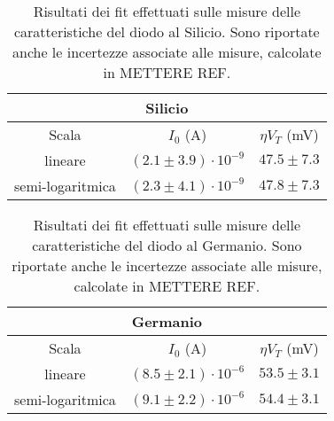 \documentclass[@SRC@/main]{subfiles}
\begin{document}
    \begin{table}[ht]
        \centering
        \begin{tabular}{||c|c|c||}
            \hline
            \multicolumn{3}{||c||}{Silicio} \\
            \hline
            Scala            & $I_0$ (\textnormal{A})       & $\eta V_T$ (\textnormal{mV}) \\
            \hline
            lineare          & $(2.1\pm3.9)\cdot 10^{-9}$   & $47.5\pm7.3$                 \\
            \hline
            semi-logaritmica & $(2.3 \pm 4.1)\cdot 10^{-9}$ & $47.8\pm 7.3$                \\
            \hline
        \end{tabular}
        \caption{Risultati dei fit effettuati sulle misure delle caratteristiche del diodo
        al Silicio. Sono riportate anche le incertezze associate alle misure, calcolate in METTERE REF.}
        \label{tab:fit-silicio}
    \end{table}

    \begin{table}[ht]
        \centering
        \begin{tabular}{||c|c|c||}
            \hline
            \multicolumn{3}{||c||}{Germanio} \\
            \hline
            Scala            & $I_0$ (\textnormal{A})       & $\eta V_T $ (\textnormal{mV}) \\
            \hline
            lineare          & $(8.5\pm2.1) \cdot 10^{-6}$  & $53.5\pm3.1$                  \\
            \hline
            semi-logaritmica & $(9.1\pm 2.2) \cdot 10^{-6}$ & $54.4\pm3.1$                  \\
            \hline
        \end{tabular}
        \caption{Risultati dei fit effettuati sulle misure delle caratteristiche del diodo
        al Germanio. Sono riportate anche le incertezze associate alle misure, calcolate in METTERE REF.}
        \label{tab:fit-germanio}
    \end{table}

\end{document}
